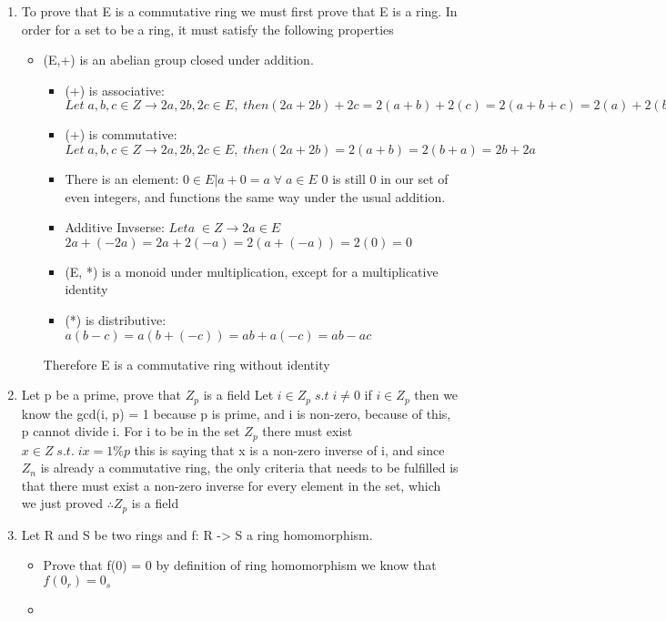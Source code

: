 \documentclass[12pt]{article}
\begin{document}
\begin{enumerate}
  \item To prove that E is a commutative ring we must first prove that E is a ring.  In order for a set to be a ring, it must satisfy the following properties
    \begin{itemize}
      \item (E,+) is an abelian group closed under addition.
        \begin{itemize}
          \item (+) is associative: $ Let \;a, b, c \in Z \rightarrow 2a, 2b, 2c \in E,\;then (2a + 2b) + 2c = 2(a + b) + 2(c) = 2(a + b + c) = 2(a) + 2(b + c) = 2a + (2b + 2c) $
          \item (+) is commutative: $ Let \;a, b, c \in Z \rightarrow 2a, 2b, 2c \in E,\;then (2a + 2b) = 2(a + b) = 2(b + a) = 2b + 2a $
          \item There is an element: $ 0 \in E | a + 0 = a \;\forall \;a \in E $ 0 is still 0 in our set of even integers, and functions the same way under the usual addition.
          \item Additive Invserse: $ Let a \; \in Z \rightarrow 2a \in E $ $ 2a + (-2a) = 2a + 2(-a) = 2(a + (-a)) = 2(0) = 0 $
      \item (E, *) is a monoid under multiplication, except for a multiplicative identity
          \item (*) is distributive: $ a(b-c) = a(b + (-c)) = ab + a(-c) = ab - ac $
        \end{itemize}
        Therefore E is a commutative ring without identity
    \end{itemize}
  \item Let p be a prime, prove that $Z_p $ is a field
    Let $ i \in Z_p \;s.t\; i \ne 0$ if $i \in Z_p $ then we know the gcd(i, p) = 1 because p is prime, and i is non-zero, because of this, p cannot divide i.  For i to be in the set $ Z_p $
    there must exist $ x \in Z \;s.t.\; ix = 1 \% p $ this is saying that x is a non-zero inverse of i, and since $Z_n$ is already a commutative ring, the only criteria that needs to be fulfilled is that there must exist
    a non-zero inverse for every element in the set, which we just proved $ \therefore Z_p$ is a field  
  \item Let R and S be two rings and f: R -> S a ring homomorphism.
    \begin{itemize}
      \item Prove that f(0) = 0
        by definition of ring homomorphism we know that $ f(0_r) = 0_s $
      \item 

\end{itemize}
\end{enumerate}
\end{document}
